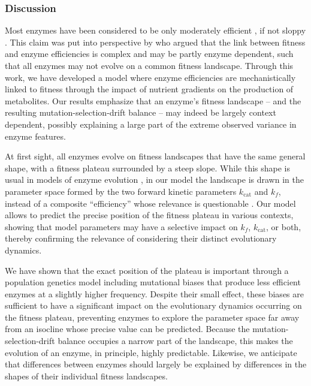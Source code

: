 \subsubsection{Discussion\label{sec:Discussion}}

Most enzymes have been considered to be only moderately efficient \citep{Bar-Even11}, if not sloppy \citep{Bar-Even15}. This claim was put into perspective by \citet{Newton18} who argued that the link between fitness and enzyme efficiencies is complex and may be partly enzyme dependent, such that all enzymes may not evolve on a common fitness landscape. Through this work, we have developed a model where enzyme efficiencies are mechanistically linked to fitness through the impact of nutrient gradients on the production of metabolites. Our results emphasize that an enzyme's fitness landscape -- and the resulting mutation-selection-drift balance -- may indeed be largely context dependent, possibly explaining a large part of the extreme observed variance in enzyme features.

At first sight, all enzymes evolve on fitness landscapes that have the same general shape, with a fitness plateau surrounded by a steep slope. While this shape is usual in models of enzyme evolution \citep{Hartl85,Kaltenbach14,Yi19}, in our model the landscape is drawn in the parameter space formed by the two forward kinetic parameters $k_\text{cat}$ and $k_f$, instead of a composite ``efficiency'' whose relevance is questionable \citep{Eisenthal07,Koshland02}. Our model allows to predict the precise position of the fitness plateau in various contexts, showing that model parameters may have a selective impact on $k_f$, $k_\text{cat}$, or both, thereby confirming the relevance of considering their distinct evolutionary dynamics. 

We have shown that the exact position of the plateau is important through a population genetics model including mutational biases that produce less efficient enzymes at a slightly higher frequency. Despite their small effect, these biases are sufficient to have a significant impact on the evolutionary dynamics occurring on the fitness plateau, preventing enzymes to explore the parameter space far away from an isocline whose precise value can be predicted. Because the mutation-selection-drift balance occupies a narrow part of the landscape, this makes the evolution of an enzyme, in principle, highly predictable. Likewise, we anticipate that differences between enzymes should largely be explained by differences in the shapes of their individual fitness landscapes. 

